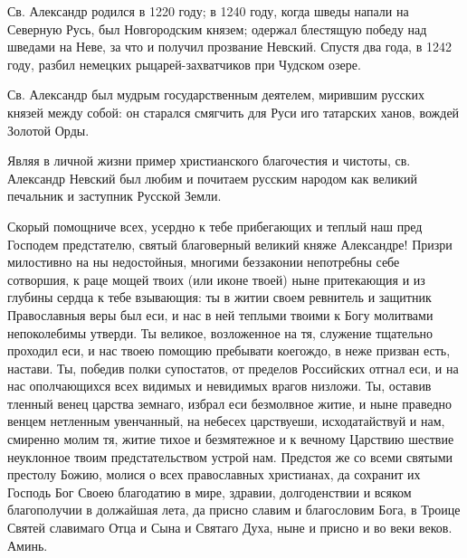 \mychapterending


\begin{mymulticols}


Св. Александр родился в 1220 году; в 1240 году, когда шведы напали на Северную Русь, был Новгородским князем; одержал блестящую победу над шведами на Неве, за что и получил прозвание Невский. Спустя два года, в 1242 году, разбил немецких рыцарей-захватчиков при Чудском озере.

Св. Александр был мудрым государственным деятелем, мирившим русских князей между собой: он старался смягчить для Руси иго татарских ханов, вождей Золотой Орды.

Являя в личной жизни пример христианского благочестия и чистоты, св. Александр Невский был любим и почитаем русским народом как великий печальник и заступник Русской Земли.



Скорый помощниче всех, усердно к тебе прибегающих и теплый наш пред Господем предстателю, святый благоверный великий княже Александре! Призри милостивно на ны недостойныя, многими беззаконии непотребны себе сотворшия, к раце мощей твоих (или иконе твоей) ныне притекающия и из глубины сердца к тебе взывающия: ты в житии своем ревнитель и защитник Православныя веры был еси, и нас в ней теплыми твоими к Богу молитвами непоколебимы утверди. Ты великое, возложенное на тя, служение тщательно проходил еси, и нас твоею помощию пребывати коегождо, в неже призван есть, настави. Ты, победив полки супостатов, от пределов Российских отгнал еси, и на нас ополчающихся всех видимых и невидимых врагов низложи. Ты, оставив тленный венец царства земнаго, избрал еси безмолвное житие, и ныне праведно венцем нетленным увенчанный, на небесех царствуеши, исходатайствуй и нам, смиренно молим тя, житие тихое и безмятежное и к вечному Царствию шествие неуклонное твоим предстательством устрой нам. Предстоя же со всеми святыми престолу Божию, молися о всех православных христианах, да сохранит их Господь Бог Своею благодатию в мире, здравии, долгоденствии и всяком благополучии в должайшая лета, да присно славим и благословим Бога, в Троице Святей славимаго Отца и Сына и Святаго Духа, ныне и присно и во веки веков. Аминь.\longpage[2]{}


\end{mymulticols}

\mychapterending


